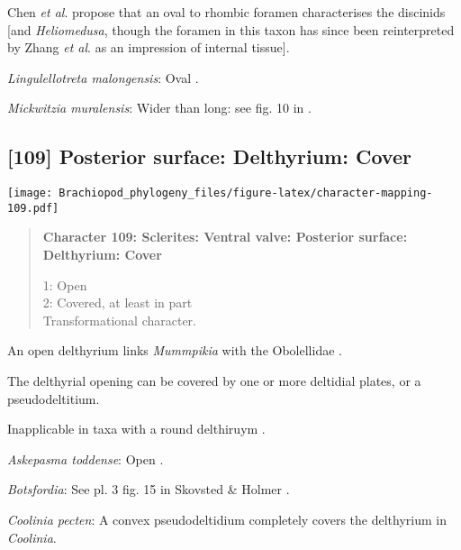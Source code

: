 \documentclass[openany]{book}
\theoremstyle{definition}
\theoremstyle{definition}
\theoremstyle{definition}
\theoremstyle{remark}
\begin{document}
Chen \emph{et al}. \citeyearpar{Chen2007Reinterpretationof} propose that
an oval to rhombic foramen characterises the discinids {[}and
\emph{Heliomedusa}, though the foramen in this taxon has since been
reinterpreted by Zhang \emph{et al}.
\citeyearpar{Zhang2009Architectureand} as an impression of internal
tissue{]}.

\hypertarget{Lingulellotreta_malongensis-coding-108}{}
\emph{Lingulellotreta malongensis}: Oval
\citep{Williams2000LinguliformeaCraniiformea}.

\hypertarget{Mickwitzia_muralensis-coding-108}{}
\emph{Mickwitzia muralensis}: Wider than long: see fig. 10 in
\citet{Balthasar2004Shellstructure}.

\subsection*{{[}109{]} Posterior surface: Delthyrium:
Cover}\label{posterior-surface-delthyrium-cover}

\texttt{[image: Brachiopod\_phylogeny\_files/figure-latex/character-mapping-109.pdf]}

\begin{quote}
\textbf{Character 109: Sclerites: Ventral valve: Posterior surface:
Delthyrium: Cover}

1: Open\\
2: Covered, at least in part\\
Transformational character.
\end{quote}

An open delthyrium links \emph{Mummpikia} with the Obolellidae
\citep{Balthasar2008iMummpikia}.

The delthyrial opening can be covered by one or more deltidial plates,
or a pseudodeltitium.

Inapplicable in taxa with a round delthiruym \citep[generated by
overgrowth of the delthyrial opening by posterolateral parts of the
shell, per][]{Popov1992TheCambrian}.

\hypertarget{Askepasma_toddense-coding-109}{}
\emph{Askepasma toddense}: Open \citep{Topper2013Theoldest}.

\hypertarget{Botsfordia-coding-109}{}
\emph{Botsfordia}: See pl. 3 fig. 15 in Skovsted \& Holmer
\citeyearpar{Skovsted2005EarlyCambrian}.

\hypertarget{Coolinia_pecten-coding-109}{}
\emph{Coolinia pecten}: A convex pseudodeltidium completely covers the
delthyrium in \emph{Coolinia}.
\end{document}
